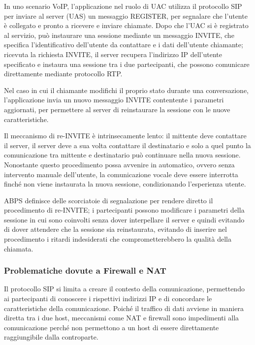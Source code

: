 \documentclass[12pt,a4paper,openright,twoside,draft]{book}
\begin{document}
In uno scenario VoIP, l'applicazione nel ruolo di UAC utilizza il
protocollo SIP per inviare al server (UAS) un messaggio REGISTER, per
segnalare che l'utente è collegato e pronto a ricevere e inviare
chiamate. Dopo che l'UAC si è registrato al servizio, può instaurare
una sessione mediante un messaggio INVITE, che specifica
l'identificativo dell'utente da contattare e i dati dell'utente
chiamante; ricevuta la richiesta INVITE, il server recupera
l'indirizzo IP dell'utente specificato e instaura una sessione tra i
due partecipanti, che possono comunicare direttamente mediante
protocollo RTP.

Nel caso in cui il chiamante modifichi il proprio stato durante una
conversazione, l'applicazione invia un nuovo messaggio INVITE
contentente i parametri aggiornati, per permettere al server di
reinstaurare la sessione con le nuove caratteristiche.

Il meccanismo di re-INVITE è intrinsecamente lento: il mittente deve
contattare il server, il server deve a sua volta contattare il
destinatario e solo a quel punto la comunicazione tra mittente e
destinatario può continuare nella nuova sessione. Nonostante questo
procedimento possa avvenire in automatico, ovvero senza intervento
manuale dell'utente, la comunicazione vocale deve essere interrotta
finché non viene instaurata la nuova sessione, condizionando
l'esperienza utente.

ABPS definisce delle scorciatoie di segnalazione per rendere diretto
il procedimento di re-INVITE; i partecipanti possono modificare i
parametri della sessione in cui sono coinvolti senza dover
interpellare il server e quindi evitando di dover attendere che la
sessione sia reinstaurata, evitando di inserire nel procedimento i
ritardi indesiderati che comprometterebbero la qualità della chiamata.

\subsubsection{Problematiche dovute a Firewall e NAT}

Il protocollo SIP si limita a creare il contesto della comunicazione,
permettendo ai partecipanti di conoscere i rispettivi indirizzi IP e
di concordare le caratteristiche della comunicazione. Poiché il
traffico di dati avviene in maniera diretta tra i due host, meccanismi
come NAT e firewall sono impedimenti alla comunicazione perché non
permettono a un host di essere direttamente raggiungibile dalla
controparte.
\end{document}
